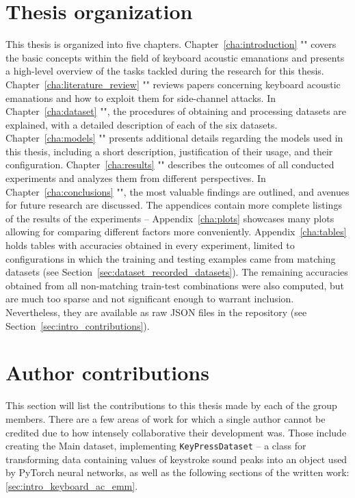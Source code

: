 \documentclass[../main.tex]{subfiles}
\begin{document}
\section{Thesis organization}
\label{sec:intro_thesis_org}
This thesis is organized into five chapters. Chapter~\ref{cha:introduction} ""
covers the basic concepts within the field of keyboard acoustic emanations and presents a high-level overview of the
tasks tackled during the research for this thesis.
Chapter~\ref{cha:literature_review} "" reviews papers concerning keyboard acoustic emanations and how to exploit them for side-channel attacks. In Chapter~\ref{cha:dataset} "", the procedures of obtaining and processing datasets are explained, with a detailed description of each of the six datasets. Chapter~\ref{cha:models} "" presents additional details regarding the models used in this thesis, including a short description, justification of their usage, and their configuration. Chapter~\ref{cha:results} "" describes the outcomes of all conducted experiments and analyzes them from different perspectives. In Chapter~\ref{cha:conclusions} "", the most valuable findings are outlined, and avenues for future research are discussed. The appendices contain more complete listings of the results of the experiments -- Appendix~\ref{cha:plots} showcases many plots allowing for comparing different factors more conveniently. Appendix~\ref{cha:tables} holds tables with accuracies obtained in every experiment, limited to configurations in which the training and testing examples came from matching datasets (see Section~\ref{sec:dataset_recorded_datasets}). The remaining accuracies obtained from all non-matching train-test combinations were also computed, but are much too sparse and not significant enough to warrant inclusion. Nevertheless, they are available as raw JSON files in the repository (see Section~\ref{sec:intro_contributions}).


\section{Author contributions}
%
This section will list the contributions to this thesis made by each of the group members. 
%
There are a few areas of work for which a single author cannot be credited due to how intensely collaborative their development was.
Those include creating the Main dataset, implementing \verb|KeyPressDataset| -- a class for transforming data containing values of keystroke sound peaks into an object used by PyTorch neural networks, as well as the following sections of the written work: \ref{sec:intro_keyboard_ac_emm}.
\end{document}
